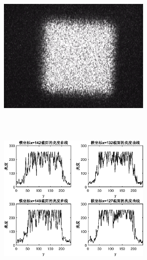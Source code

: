 \documentclass[UTF8]{ctexart}
\makeatletter
\newcommand{\figcaption}{\def\@captype{figure}\caption}
\makeatother
\begin{document}
\begin{center}
			\includegraphics[width=7.5cm,height=7.5cm]{YUANaddDOEmoveCCD25.eps}
			\includegraphics[width=7.5cm,height=7.5cm]{addDOEmoveCCD25.eps}
			\figcaption{加DOE的CCD捕捉图和光亮度曲线(CCD与DOE距离25cm)}\label{addDOEmoveCCD25}
			

\end{center}
\end{document}
